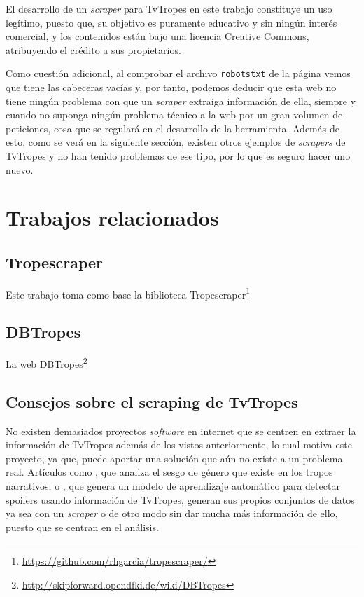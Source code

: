 El desarrollo de un \textit{scraper} para TvTropes en este trabajo constituye un
uso legítimo, puesto que, su objetivo es puramente educativo y sin ningún
interés comercial, y los contenidos están bajo una licencia Creative Commons,
atribuyendo el crédito a sus propietarios. 

Como cuestión adicional, al comprobar el archivo \texttt{robots\.txt} de la
página vemos que tiene las cabeceras vacías y, por tanto, podemos deducir que
esta web no tiene ningún problema con que un \textit{scraper} extraiga
información de ella, siempre y cuando no suponga ningún problema técnico a la
web por un gran volumen de peticiones, cosa que se regulará en el desarrollo de
la herramienta. Además de esto, como se verá en la siguiente sección, existen
otros ejemplos de \textit{scrapers} de TvTropes y no han tenido problemas de ese
tipo, por lo que es seguro hacer uno nuevo.

\section{Trabajos relacionados}
\subsection{Tropescraper}
Este trabajo toma como base la biblioteca
Tropescraper\footnote{\url{https://github.com/rhgarcia/tropescraper/}}
\cite{garcia2020startroper}

\subsection{DBTropes}
La web DBTropes\footnote{\url{http://skipforward.opendfki.de/wiki/DBTropes}}
\cite{kiesel2010dbtropes}

\subsection{Consejos sobre el scraping de TvTropes}
No existen demasiados proyectos \textit{software} en internet que se centren en
extraer la información de TvTropes además de los vistos anteriormente, lo cual
motiva este proyecto, ya que, puede aportar una solución que aún no existe a un
problema real. Artículos como \cite{gala2020analyzing}, que analiza el sesgo de
género que existe en los tropos narrativos, o \cite{boyd2013spoiler}, que genera
un modelo de aprendizaje automático para detectar spoilers usando información de
TvTropes, generan sus propios conjuntos de datos ya sea con un \textit{scraper}
o de otro modo sin dar mucha más información de ello, puesto que se centran en
el análisis. 

